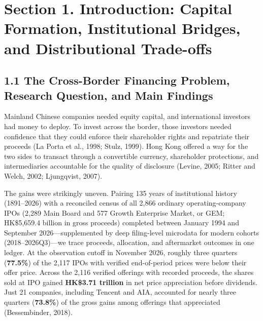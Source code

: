 \documentclass[11pt,letterpaper]{article}
\begin{document}
\clearpage
\begingroup
\small
\setlength{\parskip}{2pt}
\setcounter{tocdepth}{2}
\renewcommand{\contentsname}{Contents}
\tableofcontents
\endgroup
\clearpage


\section*{\texorpdfstring{Section 1. Introduction: Capital Formation, Institutional Bridges, and Distributional Trade-offs}{Section 1. Introduction: Capital Formation, Institutional Bridges, and Distributional Trade-offs}}
\subsection*{\texorpdfstring{1.1 The Cross-Border Financing Problem, Research Question, and Main Findings}{1.1 The Cross-Border Financing Problem, Research Question, and Main Findings}}
Mainland Chinese companies needed equity capital, and international investors had money to deploy. To invest across the border, those investors needed confidence that they could enforce their shareholder rights and repatriate their proceeds (La Porta et al., 1998; Stulz, 1999). Hong Kong offered a way for the two sides to transact through a convertible currency, shareholder protections, and intermediaries accountable for the quality of disclosure (Levine, 2005; Ritter and Welch, 2002; Ljungqvist, 2007).

The gains were strikingly uneven. Pairing 135 years of institutional history (1891–2026) with a reconciled census of all 2,866 ordinary operating-company IPOs (2,289 Main Board and 577 Growth Enterprise Market, or GEM; HK\$5,659.4 billion in gross proceeds) completed between January 1994 and September 2026—supplemented by deep filing-level microdata for modern cohorts (2018–2026Q3)—we trace proceeds, allocation, and aftermarket outcomes in one ledger. At the observation cutoff in November 2026, roughly three quarters (\textbf{77.5\%}) of the 2,117 IPOs with verified end-of-period prices were below their offer price. Across the 2,116 verified offerings with recorded proceeds, the shares sold at IPO gained \textbf{HK\$3.71 trillion} in net price appreciation before dividends. Just 21 companies, including Tencent and AIA, accounted for nearly three quarters (\textbf{73.8\%}) of the gross gains among offerings that appreciated (Bessembinder, 2018).
\end{document}
